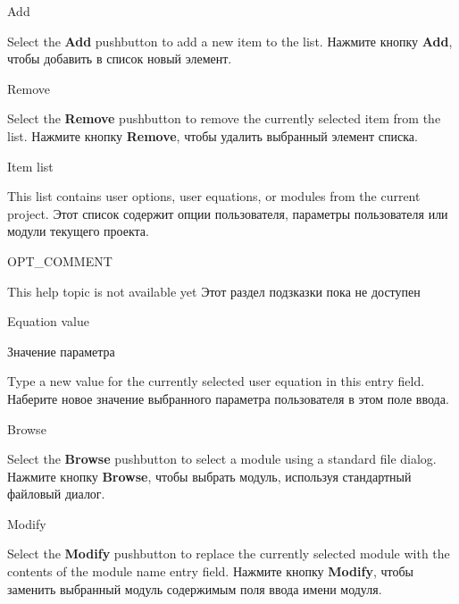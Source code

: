\begin{popup}
\caption{Add}

\ifenglish
Select the {\bf Add} pushbutton to add a new item to the list.
\else
Нажмите кнопку {\bf Add}, чтобы добавить в список новый элемент.
\fi
\end{popup}

\begin{popup}
\caption{Remove}

\ifenglish
Select the {\bf Remove} pushbutton to remove the currently selected item
from the list.
\else
Нажмите кнопку {\bf Remove}, чтобы удалить выбранный элемент списка.
\fi
\end{popup}

\begin{popup}
\caption{Item list}

\ifenglish
This list contains user options, user equations, or modules from
the current project.
\else
Этот список содержит опции пользователя, параметры пользователя или модули
текущего проекта.
\fi
\end{popup}

\begin{popup}
\caption{OPT\_COMMENT}

\ifenglish
This help topic is not available yet %
\else
Этот раздел подзказки пока не доступен %
\fi
\end{popup}

\begin{popup}
\ifenglish
\caption{Equation value}
\else
\caption{Значение параметра}
\fi
{}

\ifenglish
Type a new value for the currently selected user equation in this entry field.
\else
Наберите новое значение выбранного параметра пользователя в этом поле ввода.
\fi
\end{popup}

\begin{popup}
\caption{Browse}

\ifenglish
Select the {\bf Browse} pushbutton to select a module using a standard file
dialog.
\else
Нажмите кнопку {\bf Browse}, чтобы выбрать модуль, используя стандартный 
файловый диалог.
\fi
\end{popup}

\begin{popup}
\caption{Modify}

\ifenglish
Select the {\bf Modify} pushbutton to replace the currently selected module
with the contents of the module name entry field.
\else
Нажмите кнопку {\bf Modify}, чтобы заменить выбранный модуль содержимым поля 
ввода имени модуля.
\fi
\end{popup}

